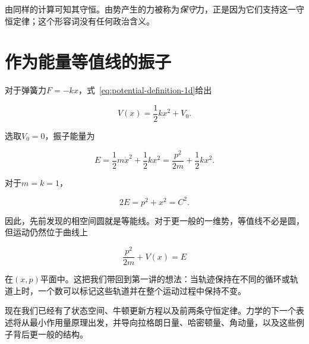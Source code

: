 由同样的计算可知其守恒。由势产生的力被称为\emph{保守}力，正是因为它们支持这一守恒定律；这个形容词没有任何政治含义。

\section{作为能量等值线的振子}
\enlargethispage{3\baselineskip}

对于弹簧力\(F=-kx\)，式~\eqref{eq:potential-definition-1d}给出

\begin{equation}
  V(x)=\frac12kx^2+V_0.
  \label{eq:spring-potential}
\end{equation}

选取\(V_0=0\)，振子能量为

\begin{equation}
  E=\frac12m\dot x^2+\frac12kx^2
   =\frac{p^2}{2m}+\frac12kx^2.
  \label{eq:oscillator-energy}
\end{equation}

对于\(m=k=1\)，

\begin{equation}
  2E=p^2+x^2=C^2.
  \label{eq:oscillator-energy-circle}
\end{equation}

因此，先前发现的相空间圆就是等能线。对于更一般的一维势，等值线不必是圆，但运动仍然位于曲线上

\begin{equation}
  \frac{p^2}{2m}+V(x)=E
  \label{eq:general-energy-contour}
\end{equation}

在\((x,p)\)平面中。这把我们带回到第一讲的想法：当轨迹保持在不同的循环或轨道上时，一个数可以标记这些轨道并在整个运动过程中保持不变。

现在我们已经有了状态空间、牛顿更新方程以及前两条守恒定律。力学的下一个表述将从最小作用量原理出发，并导向拉格朗日量、哈密顿量、角动量，以及这些例子背后更一般的结构。

\begin{classroomqa}
\end{classroomqa}